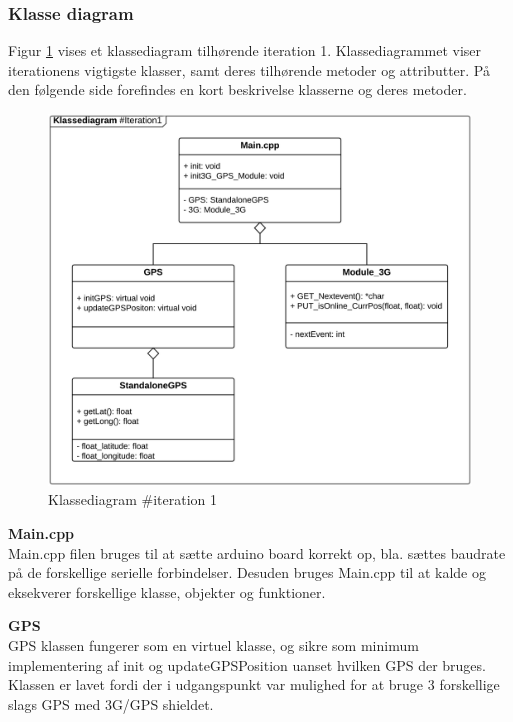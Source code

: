 \subsubsection*{Klasse diagram}
\vspace{-0.1cm}
Figur \ref{fig:classDiagram_iteration1} vises et klassediagram tilhørende iteration 1. Klassediagrammet viser iterationens vigtigste klasser, samt deres tilhørende metoder og attributter. På den følgende side forefindes en kort beskrivelse klasserne og deres metoder.

\begin{figure}[H]
	\centering
	\includegraphics[width=1\textwidth]{Billeder/klasse_diagrammer/classdiagram_iteration1.png}
	\vspace{-0.5cm}
	\caption{Klassediagram \#iteration 1}
	\label{fig:classDiagram_iteration1}
\end{figure}

\newpage

\textbf{Main.cpp} \\
Main.cpp filen bruges til at sætte arduino board korrekt op, bla. sættes baudrate på de forskellige serielle forbindelser. Desuden bruges Main.cpp til at kalde og eksekverer forskellige klasse, objekter og funktioner.

\textbf{GPS} \\
GPS klassen fungerer som en virtuel klasse, og sikre som minimum implementering af init og updateGPSPosition uanset hvilken GPS der bruges. Klassen er lavet fordi der i udgangspunkt var mulighed for at bruge 3 forskellige slags GPS med 3G/GPS shieldet. 

